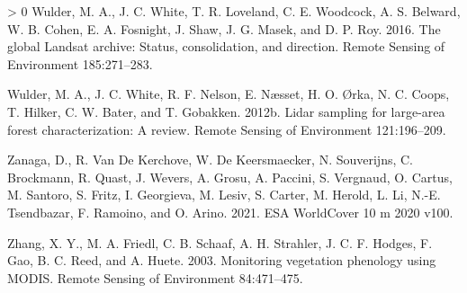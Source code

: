 \documentclass[11pt]{article}
\newlength{\cslhangindent}
\newenvironment{CSLReferences}[3] %
 {%
  \setlength{\parindent}{0pt}
  \ifodd #1 \everypar{\setlength{\hangindent}{\cslhangindent}}\ignorespaces\fi
  \ifnum #2 > 0
  \setlength{\parskip}{#2\baselineskip}
  \fi
 }%
 {}
\begin{document}
\begin{CSLReferences}{1}{0}
\leavevmode\hypertarget{ref-wulder2016}{}%
Wulder, M. A., J. C. White, T. R. Loveland, C. E. Woodcock, A. S.
Belward, W. B. Cohen, E. A. Fosnight, J. Shaw, J. G. Masek, and D. P.
Roy. 2016. The global Landsat archive: Status, consolidation, and
direction. Remote Sensing of Environment 185:271--283.

\leavevmode\hypertarget{ref-wulderLidarSamplingLargearea2012}{}%
Wulder, M. A., J. C. White, R. F. Nelson, E. Næsset, H. O. Ørka, N. C.
Coops, T. Hilker, C. W. Bater, and T. Gobakken. 2012b. Lidar sampling
for large-area forest characterization: A review. Remote Sensing of
Environment 121:196--209.

\leavevmode\hypertarget{ref-zanagadaniele2021}{}%
Zanaga, D., R. Van De Kerchove, W. De Keersmaecker, N. Souverijns, C.
Brockmann, R. Quast, J. Wevers, A. Grosu, A. Paccini, S. Vergnaud, O.
Cartus, M. Santoro, S. Fritz, I. Georgieva, M. Lesiv, S. Carter, M.
Herold, L. Li, N.-E. Tsendbazar, F. Ramoino, and O. Arino. 2021. ESA
WorldCover 10 m 2020 v100.

\leavevmode\hypertarget{ref-zhang2003}{}%
Zhang, X. Y., M. A. Friedl, C. B. Schaaf, A. H. Strahler, J. C. F.
Hodges, F. Gao, B. C. Reed, and A. Huete. 2003. Monitoring vegetation
phenology using MODIS. Remote Sensing of Environment 84:471--475.

\end{CSLReferences}
\end{document}
